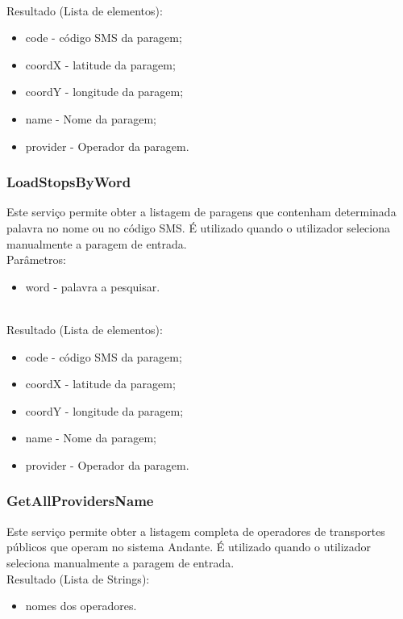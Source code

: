 ~\\Resultado (Lista de elementos):
\begin{itemize}
\item code - código SMS da paragem;
\item coordX - latitude da paragem;
\item coordY - longitude da paragem;
\item name - Nome da paragem;
\item provider - Operador da paragem.
\end{itemize}

\subsubsection{LoadStopsByWord}

Este serviço permite obter a listagem de paragens que contenham determinada palavra no nome ou no código SMS. É utilizado quando o utilizador seleciona manualmente a paragem de entrada.
\newline
~\\Parâmetros:
\begin{itemize}
\item word - palavra a pesquisar.
\end{itemize}

~\\Resultado (Lista de elementos):
\begin{itemize}
\item code - código SMS da paragem;
\item coordX - latitude da paragem;
\item coordY - longitude da paragem;
\item name - Nome da paragem;
\item provider - Operador da paragem.
\end{itemize}

\subsubsection{GetAllProvidersName}

Este serviço permite obter a listagem completa de operadores de transportes públicos que operam no sistema Andante. É utilizado quando o utilizador seleciona manualmente a paragem de entrada.
\newline
~\\Resultado (Lista de Strings):
\begin{itemize}
\item nomes dos operadores.
\end{itemize}

